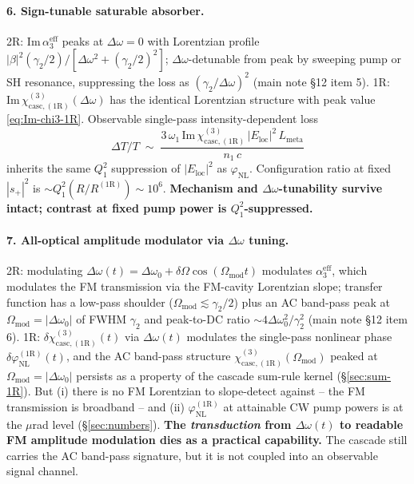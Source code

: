 \documentclass[11pt,a4paper]{article}
\newcommand{\Dom}{\Delta\omega}
\newcommand{\chicascOneR}{\chi^{(3)}_{\text{casc},(1\mathrm R)}}
\begin{document}
\paragraph{6. Sign-tunable saturable absorber.}
2R: $\mathrm{Im}\,\alpha_3^\text{eff}$ peaks at $\Dom=0$ with Lorentzian
profile $|\beta|^{2}(\gamma_2/2)/[\Dom^{2}+(\gamma_2/2)^{2}]$;
$\Dom$-detunable from peak by sweeping pump or SH resonance, suppressing
the loss as $(\gamma_2/\Dom)^{2}$ (main note \S 12 item 5).
1R: $\mathrm{Im}\,\chicascOneR(\Dom)$ has the identical Lorentzian
structure with peak value \eqref{eq:Im-chi3-1R}.  Observable single-pass
intensity-dependent loss
\begin{equation*}
  \Delta T/T\;\sim\;\frac{3\,\omega_1\,\mathrm{Im}\,\chicascOneR\,|E_\text{loc}|^{2}\,L_\text{meta}}
                         {n_1\,c}
\end{equation*}
inherits the same $Q_1^{2}$ suppression of $|E_\text{loc}|^{2}$ as
$\varphi_\text{NL}$.  Configuration ratio at fixed $|s_+|^{2}$ is
$\sim Q_1^{2}(R/R^{(1\mathrm R)})\!\sim\!10^{6}$.
\textbf{Mechanism and $\Dom$-tunability survive intact; contrast at
fixed pump power is $Q_1^{2}$-suppressed.}

\paragraph{7. All-optical amplitude modulator via $\Dom$ tuning.}
2R: modulating $\Dom(t)=\Dom_0+\delta\Omega\cos(\Omega_\text{mod}t)$
modulates $\alpha_3^\text{eff}$, which modulates the FM transmission via
the FM-cavity Lorentzian slope; transfer function has a low-pass
shoulder ($\Omega_\text{mod}\lesssim\gamma_2/2$) plus an AC band-pass
peak at $\Omega_\text{mod}=|\Dom_0|$ of FWHM $\gamma_2$ and peak-to-DC
ratio $\sim 4\Dom_0^{2}/\gamma_2^{2}$ (main note \S 12 item 6).
1R: $\delta\chicascOneR(t)$ via $\Dom(t)$ modulates the single-pass
nonlinear phase $\delta\varphi_\text{NL}^{(1\mathrm R)}(t)$, and the AC
band-pass structure $\chicascOneR(\Omega_\text{mod})$ peaked at
$\Omega_\text{mod}=|\Dom_0|$ persists as a property of the cascade
sum-rule kernel (\S\ref{sec:sum-1R}).  But (i) there is no FM Lorentzian
to slope-detect against -- the FM transmission is broadband -- and
(ii) $\varphi_\text{NL}^{(1\mathrm R)}$ at attainable CW pump powers is
at the $\mu$rad level (\S\ref{sec:numbers}).  \textbf{The
\emph{transduction} from $\Dom(t)$ to readable FM amplitude modulation
dies as a practical capability.}  The cascade still carries the AC
band-pass signature, but it is not coupled into an observable signal
channel.
\end{document}
